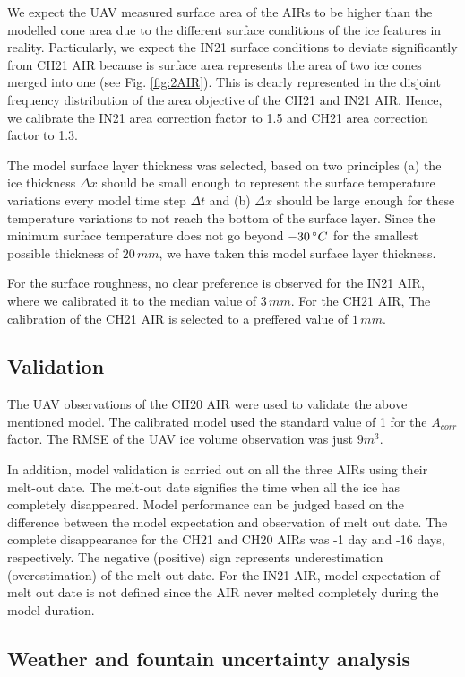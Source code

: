 \documentclass[utf8]{frontiersSCNS} %
\begin{document}
We expect the UAV measured surface area of the AIRs to be higher than the modelled cone area due to the different surface conditions of the
ice features in reality. Particularly, we expect the IN21 surface conditions to deviate significantly from CH21 AIR
because is surface area represents the area of two ice cones merged into one (see Fig. \ref{fig:2AIR}). This is clearly represented in
the disjoint frequency distribution of the area objective of the CH21 and IN21 AIR. Hence, we calibrate the IN21
area correction factor to 1.5 and CH21 area correction factor to 1.3.

The model surface layer thickness was selected, based on two principles (a) the ice thickness $\Delta x$ should
be small enough to represent the surface temperature variations every model time step $\Delta t$ and (b) $\Delta x$
should be large enough for these temperature variations to not reach the bottom of the surface layer. Since the
minimum surface temperature does not go beyond $-30 \, \degree C$ for the smallest possible thickness of $20\, mm$, we
have taken this model surface layer thickness.

For the surface roughness, no clear preference is observed for the IN21 AIR, where we calibrated it to the median
value of $3 \, mm$. For the CH21 AIR, The calibration of the CH21 AIR is selected to a preffered value of $1 \, mm$.

\subsection{Validation}

The UAV observations of the CH20 AIR were used to validate the above mentioned model. The calibrated model used the
standard value of 1 for the $A_{corr}$ factor. The RMSE of the UAV ice volume observation was just $9 m^3$.

In addition, model validation is carried out on all the three AIRs using their melt-out date. The melt-out date
signifies the time when all the ice has completely disappeared. Model performance can be judged based on the difference between the
model expectation and observation of melt out date. The complete disappearance for the CH21 and CH20 AIRs was -1 day
and -16 days, respectively. The negative (positive) sign represents underestimation (overestimation) of the melt out date.
For the IN21 AIR, model expectation of melt out date is not defined since the AIR never melted completely during the model duration.


\subsection{Weather and fountain uncertainty analysis}
\end{document}
